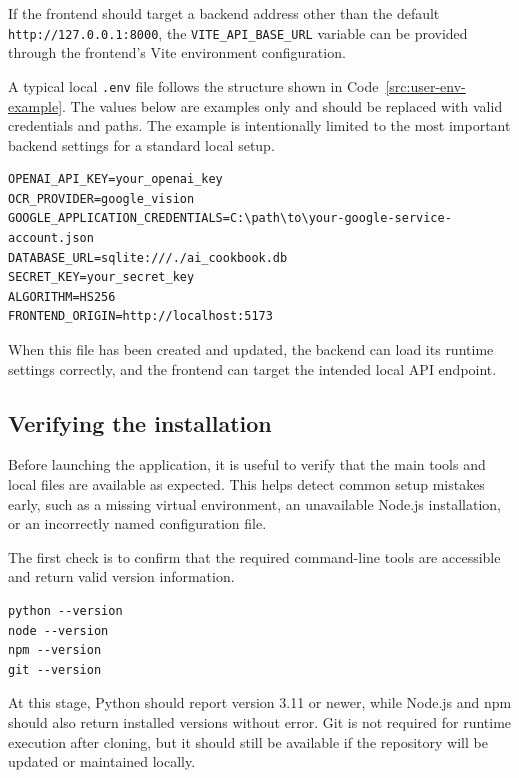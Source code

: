 If the frontend should target a backend address other than the default
\texttt{http://127.0.0.1:8000}, the \texttt{VITE\_API\_BASE\_URL}
variable can be provided through the frontend's Vite environment
configuration.

A typical local \texttt{.env} file follows the structure shown in
Code~\ref{src:user-env-example}. The values below are examples only
and should be replaced with valid credentials and paths. The example
is intentionally limited to the most important backend settings for a
standard local setup.

\begin{lstlisting}
OPENAI_API_KEY=your_openai_key
OCR_PROVIDER=google_vision
GOOGLE_APPLICATION_CREDENTIALS=C:\path\to\your-google-service-account.json
DATABASE_URL=sqlite:///./ai_cookbook.db
SECRET_KEY=your_secret_key
ALGORITHM=HS256
FRONTEND_ORIGIN=http://localhost:5173
\end{lstlisting}

When this file has been created and updated, the backend can load its
runtime settings correctly, and the frontend can target the intended
local API endpoint.

\subsection{Verifying the installation}

Before launching the application, it is useful to verify that the
main tools and local files are available as expected. This helps
detect common setup mistakes early, such as a missing virtual
environment, an unavailable Node.js installation, or an incorrectly
named configuration file.

The first check is to confirm that the required command-line tools
are accessible and return valid version information.

\begin{lstlisting}
python --version
node --version
npm --version
git --version
\end{lstlisting}

At this stage, Python should report version 3.11 or newer, while
Node.js and npm should also return installed versions without error.
Git is not required for runtime execution after cloning, but it
should still be available if the repository will be updated or
maintained locally.

